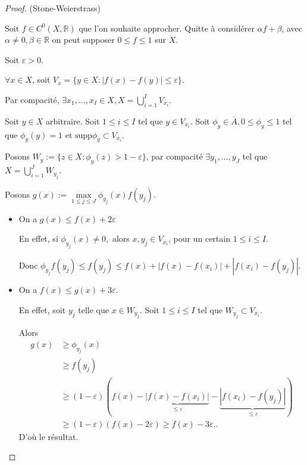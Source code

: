 \begin{proof}
	(Stone-Weierstrass)

	Soit $f \in C^0\left(X,\mathbb{R}\right)  $ que l'on souhaite approcher. Quitte à considérer $\alpha f + \beta$, avec $\alpha\neq 0, \beta \in \mathbb{R}$ on peut supposer $ 0\le f\le 1$ sur $X$.

	Soit $\varepsilon > 0$.

	$\forall x \in X$, soit $V_x = \{{y \in X : |f\left( x \right) -f\left( y \right) | \le \varepsilon}\} $.

	Par compacité, $\exists x_1,\ldots, x_I \in X, X = \bigcup_{i=1} ^I V_{x_i}$.

Soit $y \in X$ arbitraire. Soit $1\le i\le I$ tel que $y \in V_{x_i}$. Soit $\phi_{y} \in \overline{A}, 0\le \phi_y\le 1$ tel que $\phi_{y} \left( y \right) =1$ et $\text{supp} \phi_y \subset V_{x_i}$.

Posons $W_y := \{z \in X : \phi_y\left( z \right) > 1- \varepsilon\} $, par compacité $\exists y_1,\ldots,y_J$ tel que $X = \bigcup_{i=1} ^J W_{y_j}$.

Posons $g\left( x \right) := \max \limits_{1\le j\le J} \phi_{y_j}\left( x \right) f\left( y_j \right) $.

\begin{itemize}
	\item On a $g\left( x \right) \le f\left( x \right) + 2 \varepsilon$

		En effet, si $\phi_{y_j}\left( x \right) \neq 0,$ alors $x,y_j \in V_{x_i}$, pour un certain $1\le i\le I$.

		Donc $\phi_{y_j} f\left( y_j \right) \le f\left( y_j \right) \le f\left( x \right) + | f\left( x \right) - f(x_i)| + |f\left( x_i \right) - f\left( y_j \right) |$.
	\item On a $f\left( x \right) \le g\left( x \right) + 3 \varepsilon$.

		En effet, soit $y_j$ telle que $x \in W_{y_j}$. Soit $1\le i\le I$ tel que $W_{y_j} \subset V_{x_i}$.

		Alors 
		\begin{align*}
		g\left( x \right) &\ge \phi_{y_j}\left( x \right) \\
				  &\ge f\left( y_j \right) \\
				  &\ge (1-\varepsilon) \left( f(x)- \underbrace{|f\left( x \right) - f\left( x_i \right) |}_{\le  \varepsilon} - \underbrace{|f\left( x_i \right) - f\left( y_j \right) |}_{\le \varepsilon} \right)
				  \\
      &\ge \left( 1-\varepsilon \right) \left( f\left( x \right) - 2 \varepsilon \right)
				  \ge f\left( x \right) - 3 \varepsilon.
			  .\end{align*} 
			  D'où le résultat.
\end{itemize}
\end{proof}

